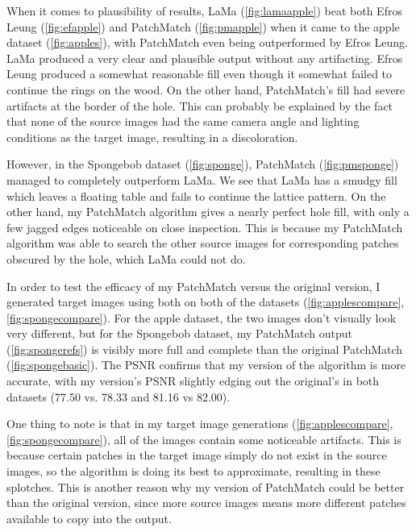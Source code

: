 When it comes to plausibility of results, LaMa (\ref{fig:lamaapple}) beat both Efros Leung (\ref{fig:efapple}) and PatchMatch (\ref{fig:pmapple}) when it came to the apple dataset (\ref{fig:apples}), with PatchMatch even being outperformed by Efros Leung. LaMa produced a very clear and plausible output without any artifacting. Efros Leung produced a somewhat reasonable fill even though it somewhat failed to continue the rings on the wood. On the other hand, PatchMatch's fill had severe artifacts at the border of the hole. This can probably be explained by the fact that none of the source images had the same camera angle and lighting conditions as the target image, resulting in a discoloration.

However, in the Spongebob dataset (\ref{fig:sponge}), PatchMatch (\ref{fig:pmsponge}) managed to completely outperform LaMa. We see that LaMa has a smudgy fill which leaves a floating table and fails to continue the lattice pattern. On the other hand, my PatchMatch algorithm gives a nearly perfect hole fill, with only a few jagged edges noticeable on close inspection. This is because my PatchMatch algorithm was able to search the other source images for corresponding patches obscured by the hole, which LaMa could not do.

In order to test the efficacy of my PatchMatch versus the original version, I generated target images using both on both of the datasets (\ref{fig:applescompare}, \ref{fig:spongecompare}). For the apple dataset, the two images don't visually look very different, but for the Spongebob dataset, my PatchMatch output (\ref{fig:spongerefs}) is visibly more full and complete than the original PatchMatch (\ref{fig:spongebasic}). The PSNR confirms that my version of the algorithm is more accurate, with my version's PSNR slightly edging out the original's in both datasets (77.50 vs. 78.33 and 81.16 vs 82.00).

One thing to note is that in my target image generations (\ref{fig:applescompare}, \ref{fig:spongecompare}), all of the images contain some noticeable artifacts. This is because certain patches in the target image simply do not exist in the source images, so the algorithm is doing its best to approximate, resulting in these splotches. This is another reason why my version of PatchMatch could be better than the original version, since more source images means more different patches available to copy into the output.